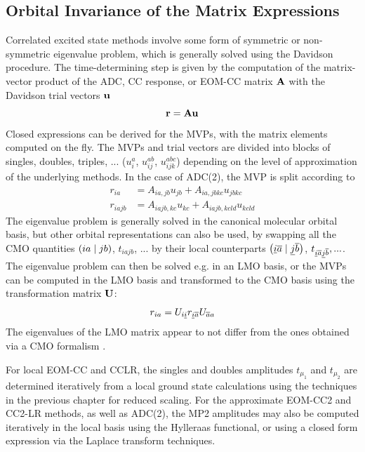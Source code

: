 \subsection{Orbital Invariance of the Matrix Expressions}

Correlated excited state methods involve some form of symmetric or non-symmetric eigenvalue problem, which is generally solved using the Davidson procedure. The time-determining step is given by the computation of the matrix-vector product of the ADC, CC response, or EOM-CC matrix $\mathbf{A}$ with the Davidson trial vectors $\mathbf{u}$
\begin{equation}
\mathbf{r} = \mathbf{A} \mathbf{u}
\end{equation}
\noindent Closed expressions can be derived for the MVPs, with the matrix elements computed on the fly. The MVPs and trial vectors are divided into blocks of singles, doubles, triples, ... ($u_i^a$, $u_{ij}^{ab}$, $u_{ijk}^{abc}$) depending on the level of approximation of the underlying methods. In the case of ADC(2), the MVP is split according to
\begin{align}
r_{ia} &= A_{ia,jb} u_{jb} + A_{ia,jbkc} u_{jbkc} \\
r_{iajb} &= A_{iajb,kc} u_{kc} + A_{iajb,kcld} u_{kcld} 
\end{align}
\noindent The eigenvalue problem is generally solved in the canonical molecular orbital basis, but other orbital representations can also be used, by swapping all the CMO quantities $\left( ia \mid jb \right)$, $t_{iajb}$, ... by their local counterparts $\left( \underline{i}\overline{a} \mid \underline{j}\overline{b} \right)$, $t_{\underline{i}\overline{a}\underline{j}\overline{b}}, ...$. The eigenvalue problem can then be solved e.g. in an LMO basis, or the MVPs can be computed in the LMO basis and transformed to the CMO basis using the transformation matrix $\mathbf{U}$:
\begin{equation}
r_{ia} = U_{i\underline{i}} r_{\underline{i}\overline{a}} U_{\overline{a} a} 
\end{equation}
\noindent The eigenvalues of the LMO matrix appear to not differ from the ones obtained via a CMO formalism \cite{Kat2009}.

For local EOM-CC and CCLR, the singles and doubles amplitudes $t_{\mu_1}$ and $t_{\mu_2}$ are determined iteratively from a local ground state calculations using the techniques in the previous chapter for reduced scaling. For the approximate EOM-CC2 and CC2-LR methods, as well as ADC(2), the MP2 amplitudes may also be computed iteratively in the local basis using the Hylleraas functional, or using a closed form expression via the Laplace transform techniques.   


